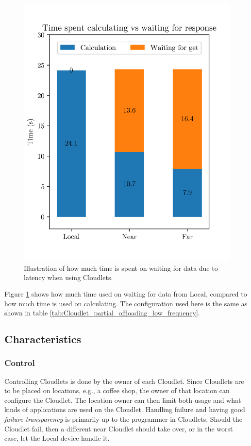 \begin{figure}[t]
    \centering
    \includegraphics[scale=1]{chapters/6_evaluation/figures/bar_local_near_far_compare_low_interaction.png}
    \caption{Illustration of how much time is spent on waiting for data due to latency when using Cloudlets.}
    \label{fig:Cloudlet_latency_bar}
\end{figure}
Figure \ref{fig:Cloudlet_latency_bar} shows how much time used on waiting for data from Local, compared to how much time is used on calculating. The configuration used here is the same as shown in table \ref{tab:Cloudlet_partial_offloading_low_frequency}.




\subsection{Characteristics}
\subsubsection{Control}
Controlling Cloudlets is done by the owner of each Cloudlet. Since Cloudlets are to be placed on locations, e.g., a coffee shop, the owner of that location can configure the Cloudlet. The location owner can then limit both usage and what kinds of applications are used on the Cloudlet. Handling failure and having good \textit{failure transparency} is primarily up to the programmer in Cloudlets. Should the Cloudlet fail, then a different near Cloudlet should take over, or in the worst case, let the Local device handle it. 

